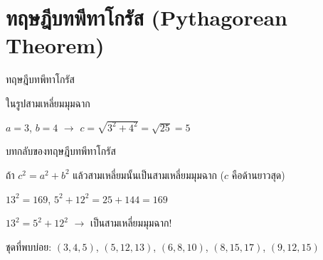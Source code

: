 \documentclass[11pt, aspectratio=169]{beamer}
\begin{document}
\section{ทฤษฎีบทพีทาโกรัส (Pythagorean Theorem)}

\begin{frame}{ทฤษฎีบทพีทาโกรัส}
  \begin{explanation}[ทฤษฎีบท]
    ในรูปสามเหลี่ยมมุมฉาก 
  \end{explanation}

  \begin{center}
  \end{center}

  \begin{exambox}[ตัวอย่าง]
    $a = 3$, $b = 4$ \quad $\rightarrow$ \quad $c = \sqrt{3^2 + 4^2} = \sqrt{25} = 5$
  \end{exambox}
\end{frame}

\begin{frame}{บทกลับของทฤษฎีบทพีทาโกรัส}
  \begin{explanation}[บทกลับ]
    ถ้า $c^2 = a^2 + b^2$ แล้วสามเหลี่ยมนั้นเป็นสามเหลี่ยมมุมฉาก ($c$ คือด้านยาวสุด)
  \end{explanation}

  \begin{exambox}[ตัวอย่าง: ด้าน 5 12 13]
    $13^2 = 169$, \quad $5^2 + 12^2 = 25 + 144 = 169$

    $13^2 = 5^2 + 12^2$ $\rightarrow$ เป็นสามเหลี่ยมมุมฉาก!
  \end{exambox}

  \begin{intuition}
    ชุดที่พบบ่อย: $(3,4,5)$, $(5,12,13)$, $(6,8,10)$, $(8,15,17)$, $(9,12,15)$
  \end{intuition}
\end{frame}
\end{document}
